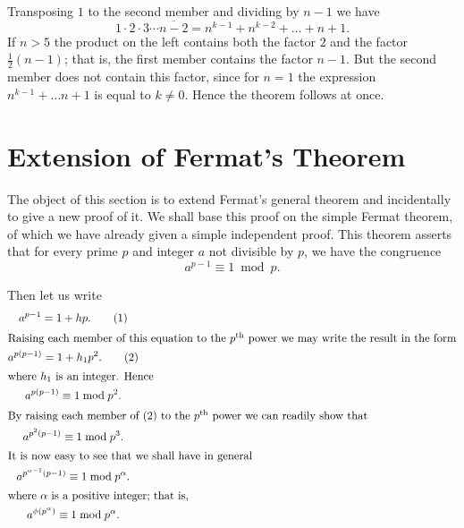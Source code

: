 \documentclass[oneside]{book}
\begin{document}
Transposing $1$ to the second member and dividing by $n - 1$ we have
\begin{equation*}
1 \cdot 2 \cdot 3 \cdots \overline{n-2} = n^{k-1} + n^{k-2}
   + \ldots + n+1.
\end{equation*}
If $n>5$ the product on the left contains both the factor $2$ and
the factor $\frac{1}{2} (n-1)$; that is, the first member contains
the factor $n - 1$. But the second member does not contain this
factor, since for $n = 1$ the expression $n^{k-1} + \ldots n + 1$ is
equal to $k \neq 0$. Hence the theorem follows at once.

\section{Extension of Fermat's Theorem}\label{s28}%

The object of this section is to extend Fermat's general theorem and
incidentally to give a new proof of it. We shall base this proof on
the simple Fermat theorem, of which we have already given a simple
independent proof. This theorem asserts that for every prime $p$ and
integer $a$ not divisible by $p$, we have the congruence
\begin{equation*}
a^{p-1} \equiv 1 \bmod p.
\end{equation*}

Then let us write
\begin{gather}
a^{p-1} = 1 + hp. \tag{1} \\
\intertext{Raising each member of this equation to the
$p^{\text{th}}$ power we may write the result in the form}
a^{p(p-1)} = 1 + h_1p^2. \tag{2} \\
\intertext{where $h_1$ is an integer. Hence}
a^{p(p-1)} \equiv 1 \bmod p^2. \notag \\
\intertext{By raising each member of (2) to the $p^{\text{th}}$
power we can readily show that}
a^{p^2(p-1)} \equiv 1 \bmod p^3. \notag \\
\intertext{It is now easy to see that we shall have in general}
a^{p^{\alpha - 1}(p-1)} \equiv 1 \bmod p^{\alpha}. \notag \\
\intertext{where $\alpha$ is a positive integer; that is,}
a^{\phi(p^{\alpha})} \equiv 1 \bmod p^{\alpha}. \notag
\end{gather}
\end{document}
